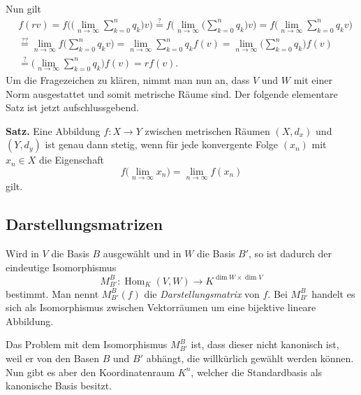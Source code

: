 \documentclass[a4paper,11pt,fleqn,twoside]{scrartcl}
\numberwithin{equation}{section}
\begin{document}
Nun gilt
\begin{equation}
\begin{split}
&f(rv) = f\bigg(\bigg(\lim_{n\to\infty}\sum_{k=0}^n q_k\bigg)v\bigg)
\stackrel{?}= f\bigg(\lim_{n\to\infty}\bigg(\sum_{k=0}^n q_k\bigg)v\bigg)
= f\bigg(\lim_{n\to\infty}\sum_{k=0}^n q_k v\bigg)\\
&\stackrel{??}= \lim_{n\to\infty} f\bigg(\sum_{k=0}^n q_k v\bigg)
= \lim_{n\to\infty}\sum_{k=0}^n q_k f(v)
= \lim_{n\to\infty}\bigg(\sum_{k=0}^n q_k\bigg) f(v)\\
&\stackrel{?}= \bigg(\lim_{n\to\infty}\sum_{k=0}^n q_k\bigg) f(v)
= r f(v).
\end{split}
\end{equation}
Um die Fragezeichen zu klären, nimmt man nun an, dass $V$ und $W$
mit einer Norm ausgestattet und somit metrische Räume sind.
Der folgende elementare Satz ist jetzt aufschlussgebend.

\textbf{Satz.} Eine Abbildung $f\colon X\to Y$ zwischen metrischen
Räumen $(X,d_x)$ und $(Y,d_y)$ ist genau dann stetig, wenn für
jede konvergente Folge $(x_n)$ mit $x_n\in X$ die Eigenschaft
\begin{equation}
f\Big(\lim_{n\to\infty} x_n\Big) = \lim_{n\to\infty} f(x_n)
\end{equation}
gilt.

\subsection{Darstellungsmatrizen}
Wird in $V$ die Basis $B$ ausgewählt und in $W$ die Basis $B'$,
so ist dadurch der eindeutige Isomorphismus
\begin{equation}
M_{B'}^B\colon \operatorname{Hom}_K(V,W)\to K^{\dim W\times\dim V}
\end{equation}
bestimmt. Man nennt $M_{B'}^B(f)$ die \emph{Darstellungsmatrix}
von $f$. Bei $M_{B'}^B$ handelt es sich als Isomorphismus zwischen
Vektorräumen um eine bijektive lineare Abbildung.

Das Problem mit dem Isomorphismus $M_{B'}^B$ ist, dass dieser nicht
kanonisch ist, weil er von den Basen $B$ und $B'$ abhängt, die
willkürlich gewählt werden können.
Nun gibt es aber den Koordinatenraum $K^n$, welcher die Standardbasis
als kanonische Basis besitzt.
\end{document}
